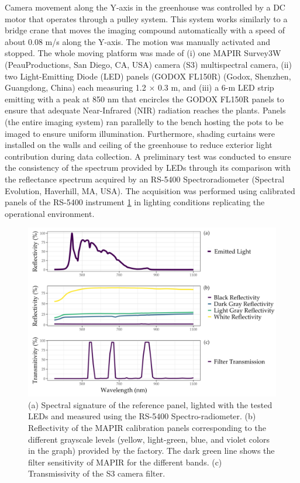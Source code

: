 \documentclass[12pt,a4paper,oneside]{report}
\begin{document}
Camera movement along the Y-axis in the greenhouse was controlled by a DC motor that operates through a pulley system. This system works similarly to a bridge crane that moves the imaging compound automatically with a speed of about 0.08 m/s along the Y-axis. The motion was manually activated and stopped.
The whole moving platform was made of (i) one MAPIR Survey3W (PeauProductions, San Diego, CA, USA) camera (S3) multispectral camera, (ii) two Light-Emitting Diode (LED) panels (GODOX FL150R) (Godox, Shenzhen, Guangdong, China) each measuring 1.2 × 0.3 m, and (iii) a 6-m LED strip emitting with a peak at 850 nm that encircles the GODOX FL150R panels to ensure that adequate Near-Infrared (NIR) radiation reaches the plants. Panels (the entire imaging system) ran parallelly to the bench hosting the pots to be imaged to ensure uniform illumination.
Furthermore, shading curtains were installed on the walls and ceiling of the greenhouse to reduce exterior light contribution during data collection.
A preliminary test was conducted to ensure the consistency of the spectrum provided by LEDs through its comparison with the reflectance spectrum acquired by an RS-5400 Spectroradiometer (Spectral Evolution, Haverhill, MA, USA). The acquisition was performed using calibrated panels of the RS-5400 instrument \cref{fig:spectral_signature} in lighting conditions replicating the operational environment.

\begin{figure}[H]
    \centering
    \includegraphics[width=\textwidth]{Images/agronomy-14-00306-g002}
    \caption{(a) Spectral signature of the reference panel, lighted with the tested LEDs and measured using the RS-5400 Spectro-radiometer. (b) Reflectivity of the MAPIR calibration panels corresponding to the different grayscale levels (yellow, light-green, blue, and violet colors in the graph) provided by the factory. The dark green line shows the filter sensitivity of MAPIR for the different bands. (c) Transmissivity of the S3 camera filter.}
    \label{fig:spectral_signature}
\end{figure}
\end{document}
